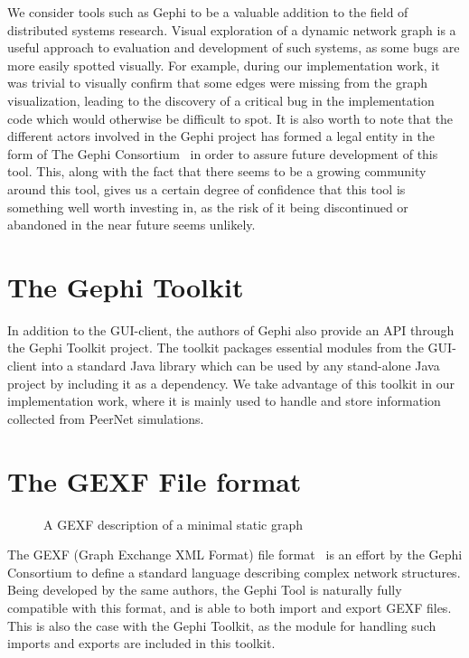 We consider tools such as Gephi to be a valuable addition to the field
of distributed systems research. Visual exploration of a dynamic network graph
is a useful approach to evaluation and development of such systems, as
some bugs are more easily spotted visually. For example, during our
implementation work, it was trivial to visually confirm that some edges
were missing from the graph visualization, leading to the discovery of a critical bug
in the implementation code which would otherwise be difficult to spot.
It is also worth to note that the different actors involved in the Gephi
project has formed a legal entity in the form of The Gephi
Consortium~\cite{gephi-consortium} in order to assure future development
of this tool. This, along with the fact that there seems to be a growing
community around this tool, gives us a certain degree of confidence that
this tool is something well worth investing in, as the risk of it
being discontinued or abandoned in the near future seems unlikely.

\section{The Gephi Toolkit}

In addition to the GUI-client, the authors of Gephi also provide an API
through the Gephi Toolkit project. The toolkit packages essential
modules from the GUI-client into a standard Java library which can
be used by any stand-alone Java project by including it as a dependency.
We take advantage of this toolkit in our implementation work, where it
is mainly used to handle and store information collected from PeerNet
simulations.

\section{The GEXF File format}
\begin{figure}[h]

\caption{A GEXF description of a minimal static graph}
\end{figure}
The GEXF (Graph Exchange XML Format) file format~\cite{gexf} is an
effort by the Gephi Consortium to define a standard language describing
complex network structures. Being developed by the same authors,
the Gephi Tool is naturally fully compatible with this format, and is
able to both import and export GEXF files. This is also the case with
the Gephi Toolkit, as the module for handling such imports and exports
are included in this toolkit.

